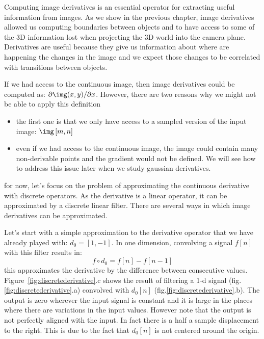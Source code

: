 Computing image derivatives is an essential operator for extracting useful information from images. As we show in the previous chapter, image derivatives allowed us computing boundaries between objects and to have access to some of the 3D information lost when projecting the 3D world into the camera plane.  Derivatives are useful because they give us information about where are happening the changes in the image and we expect those changes to be correlated with transitions between objects.


If we had access to the continuous image, then image derivatives could be computed as: $\partial \img(x,y) / \partial x$. However, there are two reasons why we might not be able to apply this definition
\begin{itemize}
	\item the first one is that we only have access to a sampled version of the input image: $\img \left[m,n\right]$
	\item even if we had access to the continuous image, the image could contain many non-derivable points and the gradient would not be defined. We will see how to address this issue later when we study gaussian derivatives.
\end{itemize}
for now, let's focus on the problem of approximating the continuous derivative with discrete operators. As the derivative is a linear operator, it can be approximated by a discrete linear filter. There are several ways in which image derivatives can be approximated.

Let's start with a simple approximation to the derivative operator that we have already played with: $d_0  = \left[1, -1 \right]$. In one dimension, convolving a signal $f \left[n \right]$ with this filter results in:
\begin{equation}
	f \circ d_0 = f \left[n \right] - f \left[n-1 \right]
\end{equation}
this approximates the derivative by the difference between consecutive values. Figure~\ref{fig:discretederivative}.c shows the result of filtering a 1-d signal (fig.\ref{fig:discretederivative}.a) convolved with $d_0 \left[n\right]$ (fig.\ref{fig:discretederivative}.b). The output is zero wherever the input signal is constant and it is large in the places where there are variations in the input values. However note that the output is not perfectly aligned with the input. In fact there is a half a sample displacement to the right. This is due to the fact that $d_0 \left[n\right]$ is not centered around the origin.

